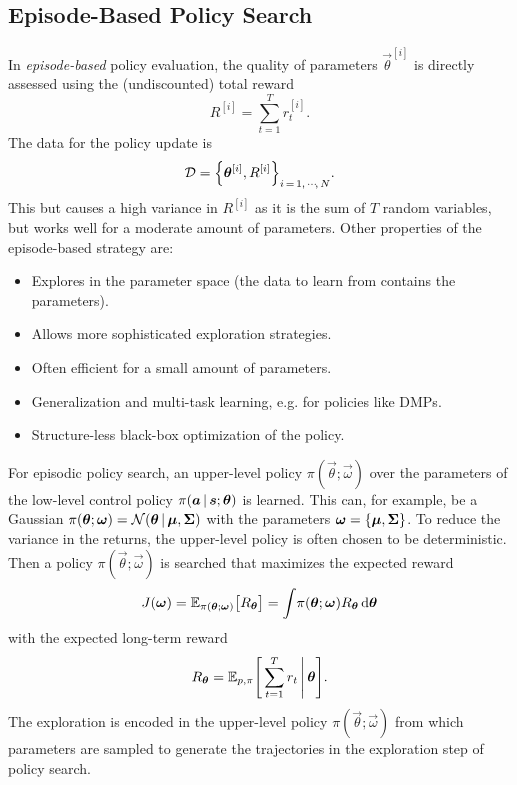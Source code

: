 		\subsection{Episode-Based Policy Search}
			\label{subsec:episodeBasedPolicySearch}

			In \emph{episode-based} policy evaluation, the quality of parameters \( \vec{\theta}^{[i]} \) is directly assessed using the (undiscounted) total reward
			\begin{equation*}
				R^{[i]} = \sum_{t = 1}^{T} r_t^{[i]}.
			\end{equation*}
			The data for the policy update is
			\begin{equation*}
				\mathcal{D} = \Big\{ \bm{\theta}^{[i]}, R^{[i]} \Big\}_{i \,=\, 1,\,\cdots\!,\,N}.
			\end{equation*}
			This but causes a high variance in \( R^{[i]} \) as it is the sum of \(T\) random variables, but works well for a moderate amount of parameters. Other properties of the episode-based strategy are:
			\begin{itemize}
				\item Explores in the parameter space (the data to learn from contains the parameters).
				\item Allows more sophisticated exploration strategies.
				\item Often efficient for a small amount of parameters.
				\item Generalization and multi-task learning, e.g. for policies like DMPs.
				\item Structure-less black-box optimization of the policy.
			\end{itemize}

			For episodic policy search, an upper-level policy \( \pi(\vec{\theta}; \vec{\omega}) \) over the parameters of the low-level control policy \( \pi(\bm{a} \,\vert\, \bm{s}; \bm{\theta}) \) is learned. This can, for example, be a Gaussian \( \pi(\bm{\theta}; \bm{\omega}) = \mathcal{N}(\bm{\theta} \,\vert\, \bm{\mu}, \bm{\Sigma}) \) with the parameters \( \bm{\omega} = \{ \bm{\mu}, \bm{\Sigma} \} \). To reduce the variance in the returns, the upper-level policy is often chosen to be deterministic. Then a policy \( \pi(\vec{\theta}; \vec{\omega}) \) is searched that maximizes the expected reward
			\begin{equation}
				J(\bm{\omega})
					= \mathbb{E}_{\pi(\bm{\theta}; \bm{\omega})}\big[ R_{\bm{\theta}} \big]
					= \int\! \pi(\bm{\theta}; \bm{\omega}) R_{\bm{\theta}} \dd{\bm{\theta}}  \label{eq:upperLevelReward}
			\end{equation}
			with the expected long-term reward
			\begin{equation*}
				R_{\bm{\theta}} = \mathbb{E}_{p, \pi}\Bigg[ \sum_{t = 1}^{T} r_t \,\Bigg\vert\, \bm{\theta} \Bigg].
			\end{equation*}
			The exploration is encoded in the upper-level policy \( \pi(\vec{\theta}; \vec{\omega}) \) from which parameters are sampled to generate the trajectories in the exploration step of policy search.


